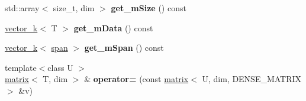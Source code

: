 \begin{DoxyCompactItemize}
\item 
\hypertarget{classkeycpp_1_1matrix_3_01_t_00_01dim_00_01_d_e_n_s_e___m_a_t_r_i_x_01_4_ab6adfcca4e5bcb325ab4945124e10233}{std\-::array$<$ size\-\_\-t, dim $>$ {\bfseries get\-\_\-m\-Size} () const }\label{classkeycpp_1_1matrix_3_01_t_00_01dim_00_01_d_e_n_s_e___m_a_t_r_i_x_01_4_ab6adfcca4e5bcb325ab4945124e10233}

\item 
\hypertarget{classkeycpp_1_1matrix_3_01_t_00_01dim_00_01_d_e_n_s_e___m_a_t_r_i_x_01_4_a600a0cde777b120af3ea25c662cd79e1}{\hyperlink{classkeycpp_1_1vector__k}{vector\-\_\-k}$<$ T $>$ {\bfseries get\-\_\-m\-Data} () const }\label{classkeycpp_1_1matrix_3_01_t_00_01dim_00_01_d_e_n_s_e___m_a_t_r_i_x_01_4_a600a0cde777b120af3ea25c662cd79e1}

\item 
\hypertarget{classkeycpp_1_1matrix_3_01_t_00_01dim_00_01_d_e_n_s_e___m_a_t_r_i_x_01_4_a47adfc7cc2ee61a785f2280a65486efa}{\hyperlink{classkeycpp_1_1vector__k}{vector\-\_\-k}$<$ \hyperlink{classkeycpp_1_1span}{span} $>$ {\bfseries get\-\_\-m\-Span} () const }\label{classkeycpp_1_1matrix_3_01_t_00_01dim_00_01_d_e_n_s_e___m_a_t_r_i_x_01_4_a47adfc7cc2ee61a785f2280a65486efa}

\item 
\hypertarget{classkeycpp_1_1matrix_3_01_t_00_01dim_00_01_d_e_n_s_e___m_a_t_r_i_x_01_4_a37bc3b9c0887bfb1f1897aec6c0df64c}{{\footnotesize template$<$class U $>$ }\\\hyperlink{classkeycpp_1_1matrix}{matrix}$<$ T, dim $>$ \& {\bfseries operator=} (const \hyperlink{classkeycpp_1_1matrix}{matrix}$<$ U, dim, D\-E\-N\-S\-E\-\_\-\-M\-A\-T\-R\-I\-X $>$ \&v)}\label{classkeycpp_1_1matrix_3_01_t_00_01dim_00_01_d_e_n_s_e___m_a_t_r_i_x_01_4_a37bc3b9c0887bfb1f1897aec6c0df64c}

\end{DoxyCompactItemize}
